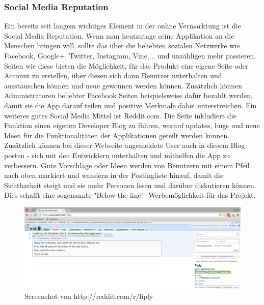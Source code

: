 \documentclass[FIPLY_base.tex]{subfiles}
\begin{document}
\subsubsection{Social Media Reputation}
Ein bereits seit langem wichtiges Element in der online Vermarktung ist die Social Media Reputation. Wenn man heutzutage seine Applikation an die Menschen bringen will, sollte das über die beliebten sozialen Netzwerke wie Facebook, Google+, Twitter, Instagram, Vine,... und unzähligen mehr passieren. Seiten wie diese bieten die Möglichkeit, für das Produkt eine eigene Seite oder Account zu erstellen, über diesen sich dann Benutzer unterhalten und ausstauschen können und neue gewonnen werden können. Zusätzlich können Administratoren beliebter Facebook Seiten beispielsweise dafür bezahlt werden, damit sie die App darauf teilen und positive Merkmale dabei unterstreichen. 
\newline
Ein weiteres gutes Social Media Mittel ist Reddit.com. Die Seite inkludiert die Funktion einen eigenen Developer Blog zu führen, worauf updates, bugs und neue Ideen für die Funktionalitäten der Applikationen geteilt werden können. Zusätzlich können bei dieser Webseite angemeldete User auch in diesem Blog posten - sich mit den Entwicklern unterhalten und mithelfen die App zu verbessern. Gute Vorschläge oder Ideen werden von Benutzern mit einem Pfeil nach oben markiert und wandern in der Postingliste hinauf, damit die Sichtbarkeit steigt und sie mehr Personen lesen und darüber diskutieren können. Dies schafft eine sogenannte "Below-the-line"- Werbemöglichkeit für das Projekt.

\begin{figure}[H]
	\centering
	\includegraphics[scale=0.28]{img/fiplysubredditscreenshot}
	\caption{Screenshot von http://reddit.com/r/fiply}
\end{figure}
\end{document}
